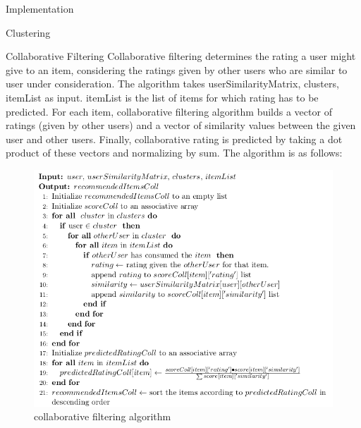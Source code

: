 \documentclass{report}
\begin{document}
\begin{projChapter}{Implementation}
\begin{projSection}{Clustering}
\end{projSection}
\begin{projSection}{Collaborative Filtering}
            Collaborative filtering determines the rating a user might give to an item, considering the ratings given by other users who are similar to user under consideration. The algorithm takes userSimilarityMatrix, clusters, itemList as input. itemList is the list of items for which rating has to be predicted. For each item, collaborative filtering algorithm builds a vector of ratings (given by other users) and a vector of similarity values between the given user and other users. Finally, collaborative rating is predicted by taking a dot product of these vectors and normalizing by sum. The algorithm is as follows:
            \begin{figure}[ht!]
\centering
\includegraphics[scale=0.5]{images/collaborative.png}
\caption{collaborative filtering algorithm}
\label{collaborative}
\end{figure}

\end{projSection}
\end{projChapter}
\end{document}
